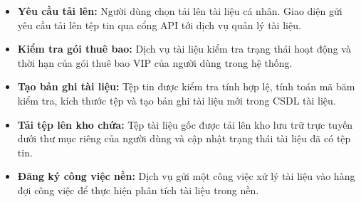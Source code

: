 \begin{itemize}

\item \textbf{Yêu cầu tải lên:}
Người dùng chọn tải lên tài liệu cá nhân.
Giao diện gửi yêu cầu tải lên tệp tin qua
cổng API tới dịch vụ quản lý tài liệu.

\item \textbf{Kiểm tra gói thuê bao:}
Dịch vụ tài liệu
kiểm tra trạng thái hoạt động
và thời hạn của gói thuê bao VIP
của người dùng trong hệ thống.

\item \textbf{Tạo bản ghi tài liệu:}
Tệp tin được kiểm tra tính hợp lệ,
tính toán mã băm kiểm tra,
kích thước tệp và
tạo bản ghi tài liệu mới
trong CSDL tài liệu.

\item \textbf{Tải tệp lên kho chứa:}
Tệp tài liệu gốc
được tải lên kho lưu trữ trực tuyến
dưới thư mục riêng của người dùng
và cập nhật trạng thái
tài liệu đã có tệp tin.

\item \textbf{Đăng ký công việc nền:}
Dịch vụ gửi một công việc xử lý tài liệu
vào hàng đợi công việc
để thực hiện phân tích tài liệu trong nền.
\end{itemize}
